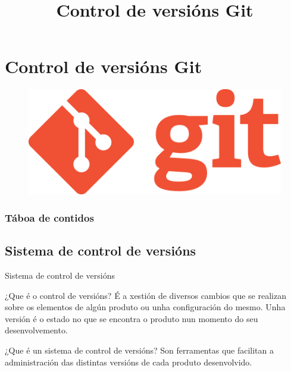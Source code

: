 
\title[Git e GitHub]{Control de versións Git}
\author[Fran Rúa e Breixo Camiña]{}

\section{Control de versións Git}
\label{sec:Git}

\begin{frame}
  \titlepage
	\begin{figure}[H]
	\centering
	\includegraphics[width=0.5\linewidth]{./img/logo-git}
	\label{fig:logo-git}
	\end{figure}
\end{frame}

\begin{frame}
	\frametitle{Táboa de contidos}
	\tableofcontents[currentsection]
\end{frame}

\subsection{Sistema de control de versións}
\label{subsec:vcs}
\begin{frame}{Sistema de control de versións}
\begin{block}{¿Que é o control de versións?}
	É a xestión de diversos cambios que se realizan sobre os elementos de algún produto ou unha configuración do mesmo. Unha versión é o estado no que se encontra o produto nun momento do seu desenvolvemento.
\end{block}
	\begin{block}{¿Que é un sistema de control de versións?}
		Son ferramentas que facilitan a administración das distintas versións de cada produto desenvolvido.
	\end{block}
\end{frame}

